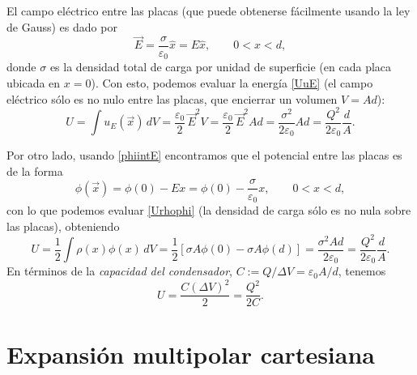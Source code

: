 El campo eléctrico entre las placas (que puede obtenerse fácilmente usando la ley de Gauss) es dado por
\begin{equation}
\vec{E}=\frac{\sigma}{\varepsilon_0}\hat{x}=E\hat{x}, \qquad 0<x<d,
\end{equation}
donde $\sigma$ es la densidad total de carga por unidad de superficie (en cada placa ubicada en $x=0$). Con esto, podemos evaluar la energía \eqref{UuE} (el campo eléctrico sólo es no nulo entre las placas, que encierrar un volumen $V=Ad$):
\begin{equation} 
U=\int u_E(\vec{x})\,dV=\frac{\varepsilon_0}{2}\,
\vec{E}^2 V=\frac{\varepsilon_0}{2}\,
\vec{E}^2 Ad=\frac{\sigma^2}{2\varepsilon_0}Ad=\frac{Q^2}{2\varepsilon_0}\frac{d}{A} .
\end{equation}

Por otro lado, usando \eqref{phiintE} encontramos que el potencial entre las placas es de la forma
\begin{equation}
\phi(\vec{x})=\phi(0)-Ex=\phi(0)-\frac{\sigma}{\varepsilon_0}x, \qquad 0<x<d,
\end{equation}
con lo que podemos evaluar \eqref{Urhophi} (la densidad de carga sólo es no nula sobre las placas), obteniendo
\begin{equation}
U=\frac{1}{2}\int\rho(x)\phi(x)\,dV=\frac{1}{2}\left[\sigma A\phi(0)-\sigma A\phi(d)\right]=\frac{\sigma^2 Ad}{2\varepsilon_0}=\frac{Q^2}{2\varepsilon_0}\frac{d}{A}.
\end{equation}
En términos de la \textit{capacidad del condensador}, $C:=Q/\Delta V=\varepsilon_0 A/d$, tenemos
\begin{equation}
U=\frac{C(\Delta V)^2}{2}=\frac{Q^2}{2C}.
\end{equation}





\section{Expansión multipolar cartesiana}

